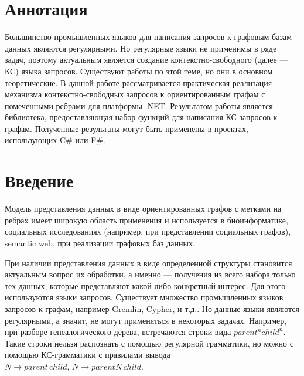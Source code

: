 \documentclass[14pt]{matmex-diploma-custom}
\begin{document}
\maketitle
\tableofcontents
\section*{Аннотация}
	Большинство промышленных языков для написания запросов к графовым базам данных являются регулярными. Но регулярные языки не применимы в ряде задач, поэтому актуальным является создание контекстно-свободного (далее --- КС) языка запросов. Существуют работы по этой теме, но они в основном теоретические. В данной работе рассматривается практическая реализация механизма контекстно-свободных запросов к ориентированным графам с помеченными ребрами для платформы .NET. Результатом работы является библиотека, предоставляющая набор функций для написания КС-запросов к графам. Полученные результаты могут быть применены в проектах, использующих C\# или F\#.

\section*{Введение}
	Модель представления данных в виде ориентированных графов с метками на ребрах имеет широкую область применения и используется в биоинформатике, социальных исследованиях (например, при представлении социальных графов), semantic web, при реализации графовых баз данных. 
	
	При наличии представления данных в виде определенной структуры становится актуальным вопрос их обработки, а именно --- получения из всего набора только тех данных, которые представляют какой-либо конкретный интерес. Для этого используются языки запросов. Существует множество промышленных языков запросов к графам, например Gremlin\cite{Gremlin}, Cypher\cite{Cypher}, и т.д.. Но данные языки являются регулярными, а значит, не могут применяться в некоторых задачах. Например, при разборе генеалогического дерева, встречаются строки вида \(parent^nchild^n\). Такие строки нельзя распознать с помощью регулярной грамматики, но можно с помощью КС-грамматики с правилами вывода \(N \to parent\,child, \,N \to parentN\, child\). 
	
\end{document}
